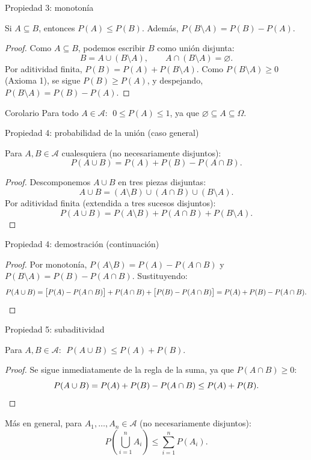 \documentclass[aspectratio=169,11pt]{beamer}
\begin{document}
\begin{frame}{Propiedad 3: monotonía}
\begin{theorem}[Monotonía]
Si $A \subseteq B$, entonces $P(A) \leq P(B)$. Además, $P(B\setminus A) = P(B)-P(A)$.
\end{theorem}
\begin{proof}
Como $A \subseteq B$, podemos escribir $B$ como unión disjunta:
\[
B = A \cup (B\setminus A), \qquad A \cap (B\setminus A) = \varnothing.
\]
Por aditividad finita, $P(B) = P(A) + P(B\setminus A)$. Como $P(B\setminus A)\geq 0$ (Axioma 1), se sigue $P(B) \geq P(A)$, y despejando, $P(B\setminus A)=P(B)-P(A)$.
\end{proof}

\begin{alertblock}{Corolario}
Para todo $A \in \mathcal{A}$: $\; 0 \leq P(A) \leq 1$, ya que $\varnothing \subseteq A \subseteq \Omega$.
\end{alertblock}
\end{frame}

\begin{frame}{Propiedad 4: probabilidad de la unión (caso general)}
\begin{theorem}
Para $A, B \in \mathcal{A}$ cualesquiera (no necesariamente disjuntos):
\[
P(A \cup B) = P(A) + P(B) - P(A \cap B).
\]
\end{theorem}
\begin{proof}
Descomponemos $A\cup B$ en tres piezas disjuntas:
\[
A\cup B = (A\setminus B) \cup (A\cap B) \cup (B\setminus A).
\]
Por aditividad finita (extendida a tres sucesos disjuntos):
\[
P(A\cup B) = P(A\setminus B) + P(A\cap B) + P(B\setminus A).
\]
\end{proof}
\end{frame}

\begin{frame}{Propiedad 4: demostración (continuación)}
\begin{proof}
Por monotonía, $P(A\setminus B) = P(A) - P(A\cap B)$ y $P(B\setminus A)=P(B)-P(A\cap B)$. Sustituyendo:
\[
P(A\cup B) = \big[P(A)-P(A\cap B)\big] + P(A\cap B) + \big[P(B)-P(A\cap B)\big] = P(A)+P(B)-P(A\cap B). \qedhere
\]
\end{proof}
\end{frame}

\begin{frame}{Propiedad 5: subaditividad}
\begin{theorem}
Para $A,B \in \mathcal{A}$: $\; P(A\cup B) \leq P(A) + P(B)$.
\end{theorem}
\begin{proof}
Se sigue inmediatamente de la regla de la suma, ya que $P(A\cap B) \geq 0$:
\[
P(A\cup B) = P(A)+P(B)-P(A\cap B) \leq P(A)+P(B). \qedhere
\]
\end{proof}
Más en general, para $A_1,\dots,A_n \in \mathcal{A}$ (no necesariamente disjuntos):
\[
P\left(\bigcup_{i=1}^n A_i\right) \leq \sum_{i=1}^n P(A_i).
\]
\end{frame}
\end{document}
